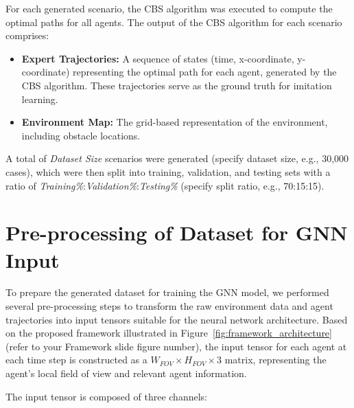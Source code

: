 For each generated scenario, the CBS algorithm was executed to compute the optimal paths for all agents. The output of the CBS algorithm for each scenario comprises:

\begin{itemize}
    \item \textbf{Expert Trajectories:} A sequence of states (time, x-coordinate, y-coordinate) representing the optimal path for each agent, generated by the CBS algorithm. These trajectories serve as the ground truth for imitation learning.
    \item \textbf{Environment Map:} The grid-based representation of the environment, including obstacle locations.
\end{itemize}

A total of \textit{Dataset Size} scenarios were generated (specify dataset size, e.g., 30,000 cases), which were then split into training, validation, and testing sets with a ratio of \textit{Training\%}:\textit{Validation\%}:\textit{Testing\%} (specify split ratio, e.g., 70:15:15).

\section{Pre-processing of Dataset for GNN Input}

To prepare the generated dataset for training the GNN model, we performed several pre-processing steps to transform the raw environment data and agent trajectories into input tensors suitable for the neural network architecture. Based on the proposed framework illustrated in Figure~\ref{fig:framework_architecture} (refer to your Framework slide figure number), the input tensor for each agent at each time step is constructed as a $W_{FOV} \times H_{FOV} \times 3$ matrix, representing the agent's local field of view and relevant agent information.

The input tensor is composed of three channels:

